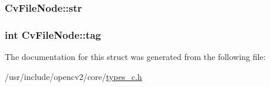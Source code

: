 \hypertarget{structCvFileNode_abab378a457de42bc84259515c5bdec9f}{
\subsubsection[{str}]{ Cv\-File\-Node\-::str}}\label{structCvFileNode_abab378a457de42bc84259515c5bdec9f}
\hypertarget{structCvFileNode_ac0bb5efe70f520883caa5966e4116b0d}{
\subsubsection[{tag}]{\setlength{\rightskip}{0pt plus 5cm}int Cv\-File\-Node\-::tag}}\label{structCvFileNode_ac0bb5efe70f520883caa5966e4116b0d}


The documentation for this struct was generated from the following file\-:\begin{DoxyCompactItemize}
\item 
/usr/include/opencv2/core/\hyperlink{core_2types__c_8h}{types\-\_\-c.\-h}\end{DoxyCompactItemize}
